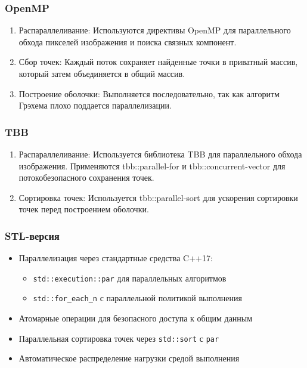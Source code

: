 \documentclass[12pt]{article}
\begin{document}
\subsubsection{OpenMP}
\begin{enumerate}
    \item Распараллеливание: Используются директивы OpenMP для параллельного обхода пикселей изображения и поиска связных компонент.
    \item Сбор точек: Каждый поток сохраняет найденные точки в приватный массив, который затем объединяется в общий массив.
    \item Построение оболочки: Выполняется последовательно, так как алгоритм Грэхема плохо поддается параллелизации.
\end{enumerate}

\subsubsection{TBB}
\begin{enumerate}
    \item Распараллеливание: Используется библиотека TBB для параллельного обхода изображения. Применяются tbb::parallel-for и tbb::concurrent-vector для потокобезопасного сохранения точек.
    \item Сортировка точек: Используется tbb::parallel-sort для ускорения сортировки точек перед построением оболочки.
\end{enumerate}

\subsubsection{STL-версия}
\begin{itemize}
    \item Параллелизация через стандартные средства C++17:
    \begin{itemize}
        \item \texttt{std::execution::par} для параллельных алгоритмов
        \item \texttt{std::for\_each\_n} с параллельной политикой выполнения
    \end{itemize}
    \item Атомарные операции для безопасного доступа к общим данным
    \item Параллельная сортировка точек через \texttt{std::sort} с \texttt{par}
    \item Автоматическое распределение нагрузки средой выполнения
\end{itemize}
\end{document}
